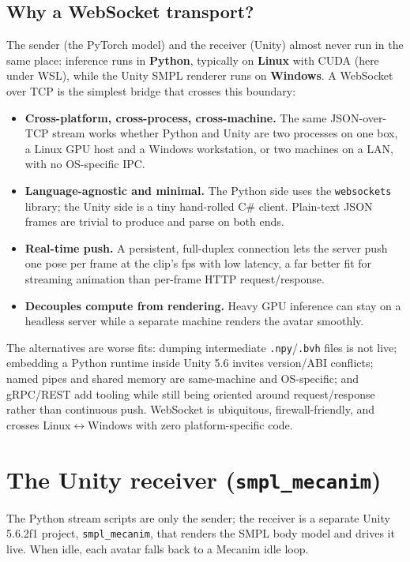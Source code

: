 \documentclass[10pt,twocolumn]{article}
\newcommand{\code}[1]{\texttt{\small #1}}
\begin{document}
\subsection{Why a WebSocket transport?}
The sender (the PyTorch model) and the receiver (Unity) almost never run in the same place:
inference runs in \textbf{Python}, typically on \textbf{Linux} with CUDA (here under WSL), while the
Unity SMPL renderer runs on \textbf{Windows}. A WebSocket over TCP is the simplest bridge that
crosses this boundary:
\begin{itemize}
  \item \textbf{Cross-platform, cross-process, cross-machine.} The same JSON-over-TCP stream works
        whether Python and Unity are two processes on one box, a Linux GPU host and a Windows
        workstation, or two machines on a LAN, with no OS-specific IPC.
  \item \textbf{Language-agnostic and minimal.} The Python side uses the \code{websockets} library;
        the Unity side is a tiny hand-rolled C\# client. Plain-text JSON frames are trivial to
        produce and parse on both ends.
  \item \textbf{Real-time push.} A persistent, full-duplex connection lets the server push one pose
        per frame at the clip's fps with low latency, a far better fit for streaming animation
        than per-frame HTTP request/response.
  \item \textbf{Decouples compute from rendering.} Heavy GPU inference can stay on a headless server
        while a separate machine renders the avatar smoothly.
\end{itemize}
The alternatives are worse fits: dumping intermediate \code{.npy}/\code{.bvh} files is not live;
embedding a Python runtime inside Unity 5.6 invites version/ABI conflicts; named pipes and shared
memory are same-machine and OS-specific; and gRPC/REST add tooling while still being oriented around
request/response rather than continuous push. WebSocket is ubiquitous, firewall-friendly, and
crosses Linux$\leftrightarrow$Windows with zero platform-specific code.

\section{The Unity receiver (\texttt{smpl\_mecanim})}
The Python stream scripts are only the sender; the receiver is a separate Unity 5.6.2f1 project,
\code{smpl\_mecanim}, that renders the SMPL body model and drives it live. When idle, each avatar
falls back to a Mecanim idle loop.
\end{document}
